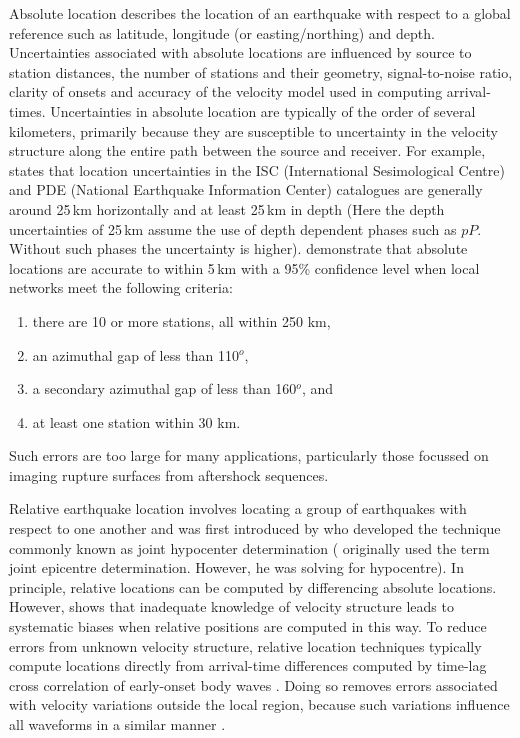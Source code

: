 \documentclass[12pt,double]{article}
\begin{document}
Absolute location describes the location of an earthquake with
respect to a global reference such as latitude, longitude (or
easting/northing) and depth. Uncertainties associated with absolute
locations are influenced by source to station distances, the number
of stations and their geometry, signal-to-noise ratio, clarity of onsets
and accuracy of the velocity model used in computing arrival-times.
Uncertainties in absolute location are typically of the order of
several kilometers, primarily because they are susceptible to uncertainty in
the velocity structure along the entire path between the source and
receiver. For example, \citet{dr_Shearer99a} states that location
uncertainties in the ISC (International Sesimological
Centre) and PDE (National Earthquake
Information
Center)
catalogues are generally around 25\,km horizontally and at least
25\,km in depth (Here the depth uncertainties of 25\,km
assume the use of depth dependent phases such as $pP$. Without such
phases the uncertainty is higher). \citet{dr_Bondar04a} demonstrate
that absolute locations are accurate to within
5\,km with a 95\% confidence level when local networks meet the following 
criteria:
\begin{enumerate}
\item there are 10 or more stations, all within 250 km, 
\item an azimuthal gap of less than 110$^o$, 
\item a secondary azimuthal gap of less than 160$^o$, and 
\item at least one station within 30 km. 
\end{enumerate}
Such errors are too large for many
applications, particularly those focussed on imaging rupture
surfaces from aftershock sequences.

Relative earthquake location involves locating a group of
earthquakes with respect to one another and was first introduced by
\citet{dr_Douglas67a} who developed the technique commonly known as
joint hypocenter determination (\citet{dr_Douglas67a}
originally used the term joint epicentre determination. However, he
was solving for hypocentre). In principle, relative locations can be
computed by differencing absolute locations. However,
\citet{dr_Pavlis92a} shows that inadequate knowledge of velocity
structure leads to systematic biases when relative positions are
computed in this way. To reduce errors from unknown velocity
structure, relative location techniques typically compute locations directly
from arrival-time differences computed by time-lag cross correlation of
early-onset body waves 
\citep{dr_Ito85a, dr_Got94a, dr_Slunga95a, dr_Nadeau97a, dr_Waldhauser99a}. Doing
so removes errors associated with velocity variations outside
the local region, because such variations influence all waveforms in
a similar manner \citep{dr_Shearer99a}.
\end{document}
